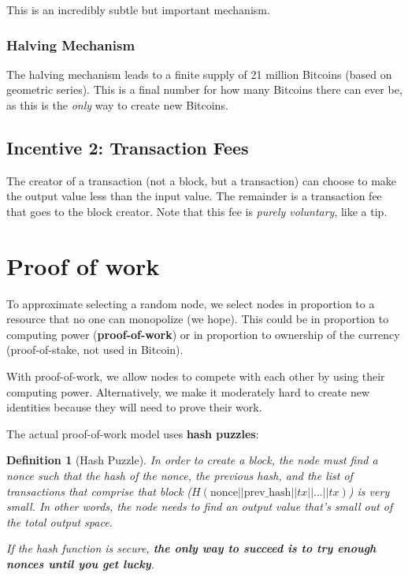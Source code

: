 \documentclass[12pt]{article}
\newtheorem*{mydef}{Definition}
\begin{document}
This is an incredibly subtle but important mechanism.

\subsubsection*{Halving Mechanism}

The halving mechanism leads to a finite supply of 21 million Bitcoins (based on geometric series). This is a final number for how many Bitcoins there can ever be, as this is the \textit{only} way to create new Bitcoins.

\subsection*{Incentive 2: Transaction Fees}

The creator of a transaction (not a block, but a transaction) can choose to make the output value less than the input value. The remainder is a transaction fee that goes to the block creator. Note that this fee is \textit{purely voluntary}, like a tip.

\section*{Proof of work}

To approximate selecting a random node, we select nodes in proportion to a resource that no one can monopolize (we hope). This could be in proportion to computing power (\textbf{proof-of-work}) or in proportion to ownership of the currency (proof-of-stake, not used in Bitcoin).

With proof-of-work, we allow nodes to compete with each other by using their computing power. Alternatively, we make it moderately hard to create new identities because they will need to prove their work.

The actual proof-of-work model uses \textbf{hash puzzles}:
\begin{mydef}[Hash Puzzle]
In order to create a block, the node must find a nonce such that the hash of the nonce, the previous hash, and the list of transactions that comprise that block ($H(\text{nonce} || \text{prev\_hash} || tx || ... || tx)$) is very small. In other words, the node needs to find an output value that's small out of the total output space.

If the hash function is secure, \textbf{the only way to succeed is to try enough nonces until you get lucky}.
\end{mydef}
\end{document}
